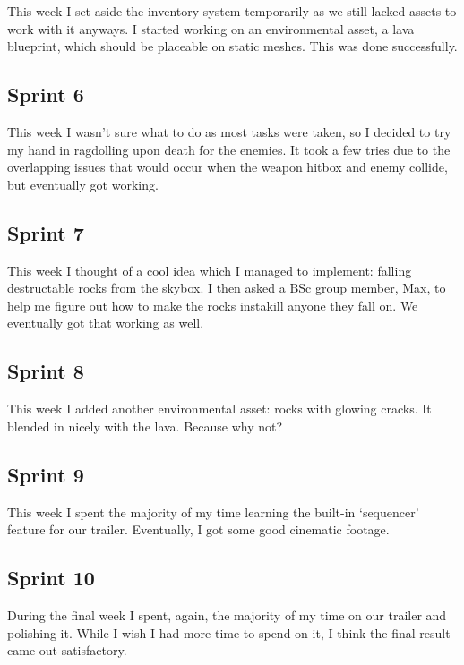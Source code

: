 \documentclass{scrartcl}
\begin{document}
This week I set aside the inventory system temporarily as we still lacked assets to work with it anyways. I started working on an environmental asset, a lava blueprint, which should be placeable on static meshes. This was done successfully. 

\subsection*{Sprint 6}

This week I wasn't sure what to do as most tasks were taken, so I decided to try my hand in ragdolling upon death for the enemies. It took a few tries due to the overlapping issues that would occur when the weapon hitbox and enemy collide, but eventually got working.

\subsection*{Sprint 7}

This week I thought of a cool idea which I managed to implement: falling destructable rocks from the skybox. I then asked a BSc group member, Max, to help me figure out how to make the rocks instakill anyone they fall on. We eventually got that working as well.

\subsection*{Sprint 8}

This week I added another environmental asset: rocks with glowing cracks. It blended in nicely with the lava. Because why not?

\subsection*{Sprint 9}

This week I spent the majority of my time learning the built-in `sequencer' feature for our trailer. Eventually, I got some good cinematic footage.  

\subsection*{Sprint 10}

During the final week I spent, again, the majority of my time on our trailer and polishing it. While I wish I had more time to spend on it, I think the final result came out satisfactory. 
\end{document}
